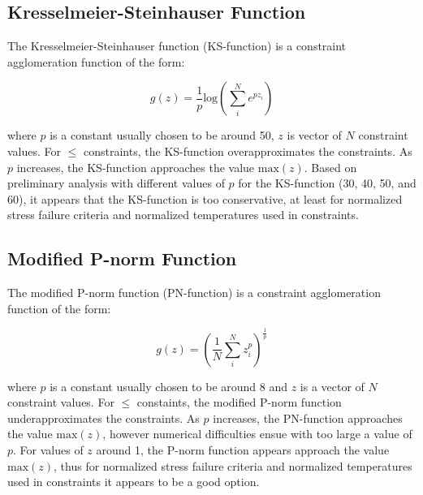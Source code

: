 \documentclass{article}
\begin{document}
\subsection{Kresselmeier-Steinhauser Function}

The Kresselmeier-Steinhauser function (KS-function) is a constraint agglomeration function of the form:

\begin{equation}
\label{eq:ks_function}
g(z) = \frac{1}{p} \textrm{log} \left( \sum_i^N e^{pz_i} \right)
\end{equation}

where $p$ is a constant usually chosen to be around 50, $z$ is vector of $N$ constraint values. For $\leq$ constraints, the KS-function overapproximates the constraints. As $p$ increases, the KS-function approaches the value $\textrm{max}(z)$. Based on preliminary analysis with different values of $p$ for the KS-function (30, 40, 50, and 60), it appears that the KS-function is too conservative, at least for normalized stress failure criteria and normalized temperatures used in constraints.

\subsection{Modified P-norm Function}

The modified P-norm function (PN-function) is a constraint agglomeration function of the form:

\begin{equation}
\label{eq:pn_function}
g(z) = \left( \frac{1}{N} \sum_i^N z_i^p \right)^{\frac{1}{p}}
\end{equation}

where $p$ is a constant usually chosen to be around 8 and $z$ is a vector of $N$ constraint values. For $\leq$ constaints, the modified P-norm function underapproximates the constraints. As $p$ increases, the PN-function approaches the value $\textrm{max}(z)$, however numerical difficulties ensue with too large a value of $p$. For values of $z$ around 1, the P-norm function appears approach the value $\textrm{max}(z)$, thus for normalized stress failure criteria and normalized temperatures used in constraints it appears to be a good option.





\end{document}
